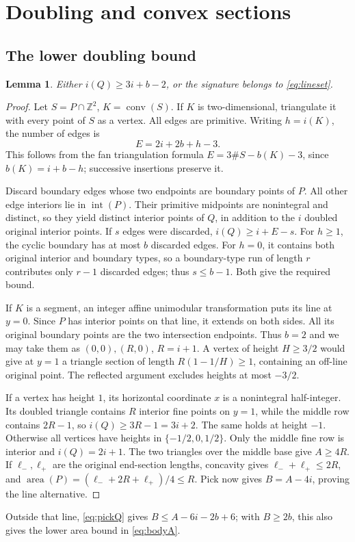 \documentclass[11pt]{article}
\newtheorem{lemma}[theorem]{Lemma}
\newcommand{\Z}{\mathbb Z}
\newcommand{\conv}{\operatorname{conv}}
\newcommand{\area}{\operatorname{area}}
\newcommand{\intr}{\operatorname{int}}
\begin{document}
\section{Doubling and convex sections}\label{sec:bounds}
\subsection{The lower doubling bound}
\begin{lemma}\label{lem:lower}
Either \(i(Q)\ge3i+b-2\), or the signature belongs to \eqref{eq:lineset}.
\end{lemma}
\begin{proof}
Let \(S=P\cap\Z^2\), \(K=\conv(S)\). If \(K\) is two-dimensional,
triangulate it with every point of \(S\) as a vertex. All edges are primitive.
Writing \(h=i(K)\), the number of edges is
\[
 E=2i+2b+h-3.
\]
This follows from the fan triangulation formula
\(E=3\#S-b(K)-3\), since \(b(K)=i+b-h\); successive insertions preserve it.

Discard boundary edges whose two endpoints are boundary points of \(P\).
All other edge interiors lie in \(\intr(P)\). Their primitive midpoints are
nonintegral and distinct, so they yield distinct interior points of \(Q\),
in addition to the \(i\) doubled original interior points.
If \(s\) edges were discarded, \(i(Q)\ge i+E-s\).
For \(h\ge1\), the cyclic boundary has at most \(b\) discarded edges.
For \(h=0\), it contains both original interior and boundary types, so a
boundary-type run of length \(r\) contributes only \(r-1\) discarded edges;
thus \(s\le b-1\). Both give the required bound.

If \(K\) is a segment, an integer affine unimodular transformation puts its
line at \(y=0\). Since \(P\) has interior points on that line, it extends
on both sides. All its original boundary points are the two intersection
endpoints. Thus \(b=2\) and we may take them as \((0,0),(R,0)\), \(R=i+1\).
A vertex of height \(H\ge3/2\) would give at \(y=1\) a triangle section of
length \(R(1-1/H)\ge1\), containing an off-line original point.
The reflected argument excludes heights at most \(-3/2\).

If a vertex has height \(1\), its horizontal coordinate \(x\) is a
nonintegral half-integer. Its doubled triangle contains \(R\) interior
fine points on \(y=1\), while the middle row contains \(2R-1\), so
\(i(Q)\ge3R-1=3i+2\). The same holds at height \(-1\).
Otherwise all vertices have heights in \(\{-1/2,0,1/2\}\).
Only the middle fine row is interior and \(i(Q)=2i+1\).
The two triangles over the middle base give \(A\ge4R\).
If \(\ell_-,\ell_+\) are the original end-section lengths, concavity gives
\(\ell_-+\ell_+\le2R\), and
\(\area(P)=(\ell_-+2R+\ell_+)/4\le R\).
Pick now gives \(B=A-4i\), proving the line alternative.
\end{proof}
Outside that line, \eqref{eq:pickQ} gives
\(B\le A-6i-2b+6\); with \(B\ge2b\), this also gives the lower
area bound in \eqref{eq:bodyA}.
\end{document}
